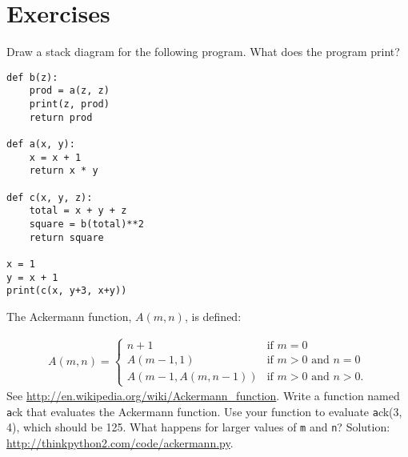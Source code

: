 \documentclass[
DIV=11,
fontsize=13,
twoside,
headinclude=false,
titlepage=firstiscover,
abstract=true,
headsepline=true,
footsepline=true,
chapterprefix=true, %
headings=big,
bibliography=totoc,%
captions=tableheading
]{scrbook}
\theoremstyle{definition}
\begin{document}
\section{Exercises}

\begin{exercise}
\normalfont

Draw a stack diagram for the following program.  What does the program print?

\begin{lstlisting}
def b(z):
    prod = a(z, z)
    print(z, prod)
    return prod

def a(x, y):
    x = x + 1
    return x * y

def c(x, y, z):
    total = x + y + z
    square = b(total)**2
    return square

x = 1
y = x + 1
print(c(x, y+3, x+y))
\end{lstlisting}

\end{exercise}


\begin{exercise}
\normalfont
\label{ackermann}

The Ackermann function, $A(m, n)$, is defined:

\begin{eqnarray*}
A(m, n) = \begin{cases} 
              n+1 & \mbox{if } m = 0 \\ 
        A(m-1, 1) & \mbox{if } m > 0 \mbox{ and } n = 0 \\ 
A(m-1, A(m, n-1)) & \mbox{if } m > 0 \mbox{ and } n > 0.
\end{cases} 
\end{eqnarray*}
%
See \url{http://en.wikipedia.org/wiki/Ackermann_function}.
Write a function named {\texttt ack} that evaluates the Ackermann function.
Use your function to evaluate {\texttt ack(3, 4)}, which should be 125.
What happens for larger values of {\texttt m} and {\texttt n}?
Solution: \url{http://thinkpython2.com/code/ackermann.py}.

\end{exercise}
\end{document}
